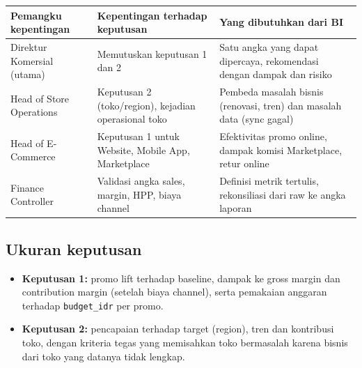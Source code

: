 \documentclass[10pt,a4paper]{article}
\providecommand{\tightlist}{\setlength{\itemsep}{1pt}\setlength{\parskip}{0pt}}
\begin{document}
{\def\LTcaptype{none} %
\begin{longtable}[]{@{}
  >{\raggedright\arraybackslash}p{}
  >{\raggedright\arraybackslash}p{}
  >{\raggedright\arraybackslash}p{}@{}}
\toprule\noalign{}
\begin{minipage}[b]{\linewidth}\raggedright
Pemangku kepentingan
\end{minipage} & \begin{minipage}[b]{\linewidth}\raggedright
Kepentingan terhadap keputusan
\end{minipage} & \begin{minipage}[b]{\linewidth}\raggedright
Yang dibutuhkan dari BI
\end{minipage} \\
\midrule\noalign{}
\endhead
\bottomrule\noalign{}
\endlastfoot
Direktur Komersial (utama) & Memutuskan keputusan 1 dan 2 & Satu angka yang dapat dipercaya, rekomendasi dengan dampak dan risiko \\
Head of Store Operations & Keputusan 2 (toko/region), kejadian operasional toko & Pembeda masalah bisnis (renovasi, tren) dan masalah data (sync gagal) \\
Head of E-Commerce & Keputusan 1 untuk Website, Mobile App, Marketplace & Efektivitas promo online, dampak komisi Marketplace, retur online \\
Finance Controller & Validasi angka sales, margin, HPP, biaya channel & Definisi metrik tertulis, rekonsiliasi dari raw ke angka laporan \\
\end{longtable}
}

\subsection{Ukuran keputusan}\label{ukuran-keputusan}

\begin{itemize}
\tightlist
\item
  \textbf{Keputusan 1:} promo lift terhadap baseline, dampak ke gross margin dan contribution margin (setelah biaya channel), serta pemakaian anggaran terhadap \texttt{budget\_\allowbreak{}idr} per promo.
\item
  \textbf{Keputusan 2:} pencapaian terhadap target (region), tren dan kontribusi toko, dengan kriteria tegas yang memisahkan toko bermasalah karena bisnis dari toko yang datanya tidak lengkap.
\end{itemize}
\end{document}
